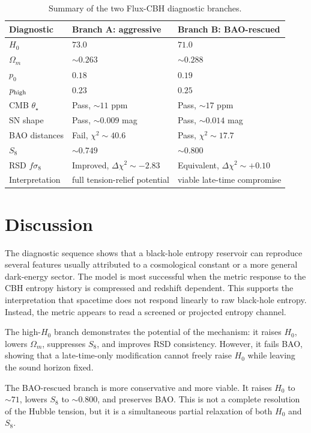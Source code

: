 \documentclass[11pt,a4paper]{article}
\begin{document}
\begin{table}[htbp]
\centering
\caption{Summary of the two Flux-CBH diagnostic branches.}
\begin{tabular}{lll}
\toprule
Diagnostic & Branch A: aggressive & Branch B: BAO-rescued \\
\midrule
$H_0$ & $73.0$ & $71.0$ \\
$\Omega_m$ & $\sim0.263$ & $\sim0.288$ \\
$p_0$ & $0.18$ & $0.19$ \\
$p_{\rm high}$ & $0.23$ & $0.25$ \\
CMB $\theta_\star$ & Pass, $\sim11$ ppm & Pass, $\sim17$ ppm \\
SN shape & Pass, $\sim0.009$ mag & Pass, $\sim0.014$ mag \\
BAO distances & Fail, $\chi^2\sim40.6$ & Pass, $\chi^2\sim17.7$ \\
$S_8$ & $\sim0.749$ & $\sim0.800$ \\
RSD $f\sigma_8$ & Improved, $\Delta\chi^2\sim-2.83$ & Equivalent, $\Delta\chi^2\sim+0.10$ \\
Interpretation & full tension-relief potential & viable late-time compromise \\
\bottomrule
\end{tabular}
\end{table}

\section{Discussion}

The diagnostic sequence shows that a black-hole entropy reservoir can reproduce several features usually attributed to a cosmological constant or a more general dark-energy sector. The model is most successful when the metric response to the CBH entropy history is compressed and redshift dependent. This supports the interpretation that spacetime does not respond linearly to raw black-hole entropy. Instead, the metric appears to read a screened or projected entropy channel.

The high-$H_0$ branch demonstrates the potential of the mechanism: it raises $H_0$, lowers $\Omega_m$, suppresses $S_8$, and improves RSD consistency. However, it fails BAO, showing that a late-time-only modification cannot freely raise $H_0$ while leaving the sound horizon fixed.

The BAO-rescued branch is more conservative and more viable. It raises $H_0$ to $\sim71$, lowers $S_8$ to $\sim0.800$, and preserves BAO. This is not a complete resolution of the Hubble tension, but it is a simultaneous partial relaxation of both $H_0$ and $S_8$.
\end{document}
